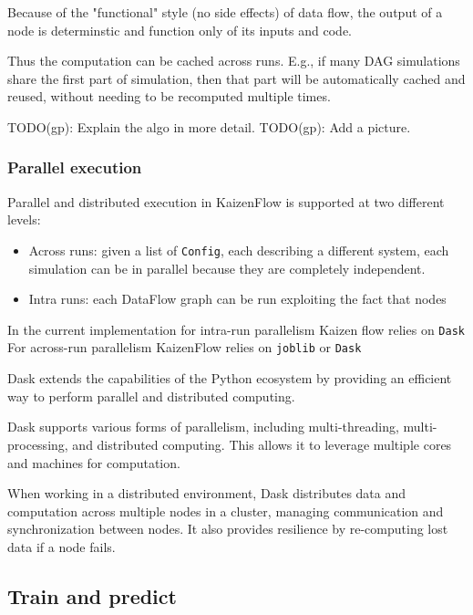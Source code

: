 \documentclass[11pt, reqno]{amsart}
\theoremstyle{definition}
\theoremstyle{remark}
\begin{document}
  Because of the "functional" style (no side effects) of data flow, the output
  of a node is determinstic and function only of its inputs and code.

  Thus the computation can be cached across runs. E.g., if many DAG simulations share
  the first part of simulation, then that part will be automatically cached and
  reused, without needing to be recomputed multiple times.

  TODO(gp): Explain the algo in more detail. TODO(gp): Add a picture.

  \subsubsection{Parallel execution}

  Parallel and distributed execution in KaizenFlow is supported at two different
  levels:
  \begin{itemize}
    \item Across runs: given a list of \verb|Config|, each describing a different
      system, each simulation can be in parallel because they are completely
      independent.

    \item Intra runs: each DataFlow graph can be run exploiting the fact that
      nodes
  \end{itemize}

  In the current implementation for intra-run parallelism Kaizen flow relies on \verb|Dask|
  For across-run parallelism KaizenFlow relies on \verb|joblib| or \verb|Dask|

  Dask extends the capabilities of the Python ecosystem by providing an
  efficient way to perform parallel and distributed computing.

  Dask supports various forms of parallelism, including multi-threading, multi-processing,
  and distributed computing. This allows it to leverage multiple cores and
  machines for computation.

  When working in a distributed environment, Dask distributes data and computation
  across multiple nodes in a cluster, managing communication and synchronization
  between nodes. It also provides resilience by re-computing lost data if a node
  fails.

  \subsection{Train and predict}
\end{document}
